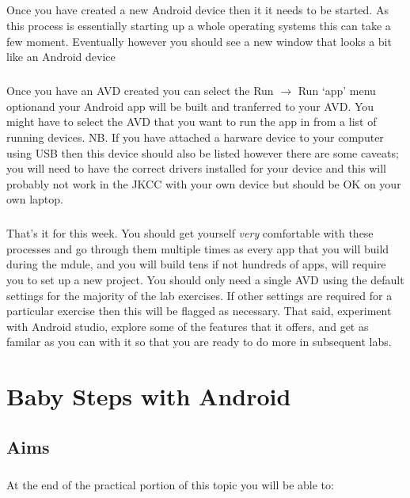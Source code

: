 \documentclass[12pt, a4paper, twoside]{book}
\begin{document}
\paragraph{} Once you have created a new Android device then it it needs to be started. As this process is essentially starting up a whole operating systems this can take a few moment. Eventually however you should see a new window that looks a bit like an Android device

\paragraph{} Once you have an AVD created you can select the Run $\to$ Run `app' menu optionand your Android app will be built and tranferred to your AVD. You might have to select the AVD that you want to run the app in from a list of running devices. NB. If you have attached a harware device to your computer using USB then this device should also be listed however there are some caveats; you will need to have the correct drivers installed for your device and this will probably not work in the JKCC with your own device but should be OK on your own laptop.

\paragraph{} That's it for this week. You should get yourself \emph{very} comfortable with these processes and go through them multiple times as every app that you will build during the mdule, and you will build tens if not hundreds of apps, will require you to set up a new project. You should only need a single AVD using the default settings for the majority of the lab exercises. If other settings are required for a particular exercise then this will be flagged as necessary. That said, experiment with Android studio, explore some of the features that it offers, and get as familar as you can with it so that you are ready to do more in subsequent labs.




\chapter{Baby Steps with Android}

\section{Aims}
\paragraph{} At the end of the practical portion of this topic you will be able to:
\end{document}
